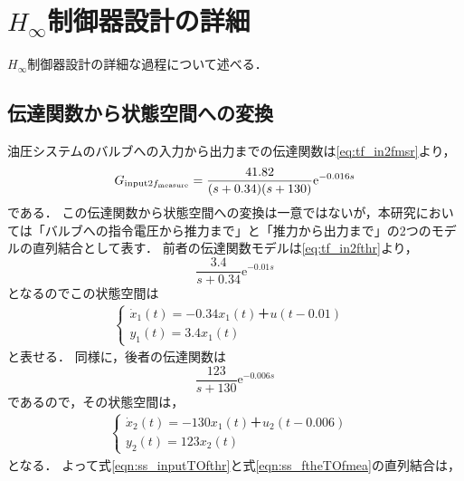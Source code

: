 \chapter{$H_\infty$制御器設計の詳細}
$H_\infty$制御器設計の詳細な過程について述べる．
\section{伝達関数から状態空間への変換}
\label{sec:tf2ss}
油圧システムのバルブへの入力から出力までの伝達関数は\eqnname\ref{eq:tf_in2fmsr}より，
\begin{align}
    G_{\mathrm{input}2f_\mathrm{measure}} = \frac{41.82}{(s+0.34)(s+130)}\mathrm{e}^{-0.016s}
\end{align}
である．
この伝達関数から状態空間への変換は一意ではないが，本研究においては「バルブへの指令電圧から推力まで」と「推力から出力まで」の2つのモデルの直列結合として表す．
前者の伝達関数モデルは\eqnname\ref{eq:tf_in2fthr}より，
\begin{equation}
	\frac{3.4}{s+0.34}\mathrm{e}^{-0.01s}
\end{equation}
となるのでこの状態空間は
\begin{align}
	\begin{cases}
		\dot{x}_1(t) = -0.34x_1(t)＋u(t-0.01) &\\
		y_1(t) = 3.4x_1(t)&
	\end{cases}
	\label{eqn:ss_inputTOfthr}
\end{align}
と表せる．
同様に，後者の伝達関数は
\begin{equation}
	\frac{123}{s+130}\mathrm{e}^{-0.006s}
\end{equation}
であるので，その状態空間は，
\begin{align}
	\begin{cases}
		\dot{x}_2(t) = -130x_1(t)＋u_2(t-0.006) &\\
		y_2(t) = 123x_2(t)&
	\end{cases}
	\label{eqn:ss_ftheTOfmea}
\end{align}
となる．
よって式\ref{eqn:ss_inputTOfthr}と式\ref{eqn:ss_ftheTOfmea}の直列結合は，
